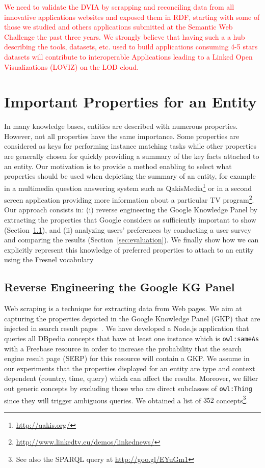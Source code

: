 \textcolor{red}{We need to validate the DVIA by scrapping and reconciling data from all innovative applications websites and exposed them in RDF, starting with some of those we studied and others applications submitted at the Semantic Web Challenge the past three years. We strongly believe that having such a a hub  describing the tools, datasets, etc.  used to build  applications consuming 4-5 stars datasets will contribute to interoperable Applications leading to a Linked Open Visualizations (LOVIZ) on the LOD cloud.}


\section{Important Properties for an Entity}
\label{sec:propEntities}
In many knowledge bases, entities are described with numerous properties. However, not all properties have the same importance. Some properties are considered as keys for performing instance matching tasks while other properties are generally chosen for quickly providing a summary of the key facts attached to an entity. Our motivation is to provide a method enabling to select what properties should be used when depicting the summary of an entity, for example in a multimedia question answering system such as QakisMedia\footnote{\url{http://qakis.org/}} or in a second screen application providing more information about a particular TV program\footnote{\url{http://www.linkedtv.eu/demos/linkednews/}}. Our approach consists in: (i) reverse engineering the Google Knowledge Panel by extracting the properties that Google considers as sufficiently important to show (Section~\ref{sec:knowledge-graph}), and (ii) analyzing users' preferences by conducting a user survey and comparing the results (Section~\ref{sec:evaluation}). We finally show how we can explicitly represent this knowledge of preferred properties to attach to an entity using the Fresnel vocabulary

\subsection{Reverse Engineering the Google KG Panel}
\label{sec:knowledge-graph}
Web scraping is a technique for extracting data from Web pages. We aim at capturing the properties depicted in the Google Knowledge Panel (GKP) that are injected in search result pages~\cite{Bergman2012}. We have developed a Node.js application that queries all DBpedia concepts that have at least one instance which is \texttt{owl:sameAs} with a Freebase resource in order to increase the probability that the search engine result page (SERP) for this resource will contain a GKP. We assume in our experiments that the properties displayed for an entity are type and context dependent (country, time, query) which can affect the results. Moreover, we filter out generic concepts by excluding those who are direct subclasses of \texttt{owl:Thing} since they will trigger ambiguous queries. We obtained a list of $352$ concepts\footnote{See also the SPARQL query at \url{http://goo.gl/EYuGm1}}.

